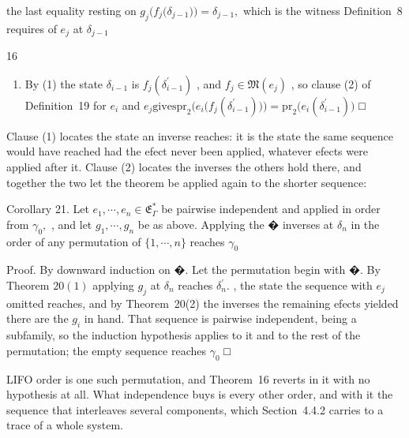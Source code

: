 \documentclass[
  10
]{article}
\providecommand{\tightlist}{%
  \setlength{\itemsep}{0pt}\setlength{\parskip}{0pt}}
\begin{document}
the last equality resting on
\(g _ { j } \big ( f _ { j } \big ( \delta _ { j - 1 } \big ) \big ) = \delta _ { j - 1 } ,\)
which is the witness Definition~8 requires of \(e _ { j }\) at
\(\delta _ { j - 1 }\)

16

\begin{enumerate}
\def\labelenumi{\arabic{enumi}.}
\setcounter{enumi}{1}
\tightlist
\item
  By (1) the state \(\delta _ { i - 1 }\) is
  \(f _ { j } ( \delta _ { i - 1 } ^ { \prime } )\) , and
  \(f _ { j } \in \mathfrak { M } ( e _ { j } )\) , so clause (2) of
  Definition~19 for \(e _ { i }\) and
  \(e _ { j } \mathrm { g i v e s p r } _ { 2 } \big ( e _ { i } \big ( f _ { j } ( \delta _ { i - 1 } ^ { \prime } ) \big ) \big ) = \mathrm { p r } _ { 2 } \big ( e _ { i } ( \delta _ { i - 1 } ^ { \prime } ) \big )\)
  □
\end{enumerate}

Clause (1) locates the state an inverse reaches: it is the state the
same sequence would have reached had the efect never been applied,
whatever efects were applied after it. Clause (2) locates the inverses
the others hold there, and together the two let the theorem be applied
again to the shorter sequence:

Corollary 21. Let
\(e _ { 1 } , \cdots , e _ { n } \in \mathfrak { E } _ { \Gamma } ^ { * }\)
be pairwise independent and applied in order from \(\gamma _ { 0 } ,\) ,
and let \(g _ { 1 } , \cdots , g _ { n }\) be as above. Applying the �
inverses at \(\delta _ { n }\) in the order of any permutation of
\(\{ 1 , \cdots , n \}\) reaches \(\gamma _ { 0 }\)

Proof. By downward induction on �. Let the permutation begin with �. By
Theorem \(2 0 ( 1 )\) applying \(g _ { j }\) at \(\delta _ { n }\)
reaches \(\delta _ { n } ^ { \prime } .\) , the state the sequence with
\(e _ { j }\) omitted reaches, and by Theorem~20(2) the inverses the
remaining efects yielded there are the \(g _ { i }\) in hand. That
sequence is pairwise independent, being a subfamily, so the induction
hypothesis applies to it and to the rest of the permutation; the empty
sequence reaches \(\gamma _ { 0 }\) □

LIFO order is one such permutation, and Theorem~16 reverts in it with no
hypothesis at all. What independence buys is every other order, and with
it the sequence that interleaves several components, which Section~4.4.2
carries to a trace of a whole system.
\end{document}
